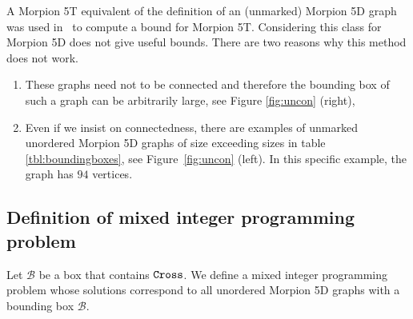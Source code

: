 \begin{remark}
%
A Morpion 5T equivalent of the definition of an (unmarked) Morpion 5D graph was 
  used in~\cite{ijcai} to compute a bound for Morpion 5T.
Considering this class for Morpion 5D  does not give useful bounds. There are two reasons why this method does not work.
\begin{enumerate}
\item These graphs need not to be connected and therefore the bounding box of such a graph
  can be arbitrarily large, see Figure \ref{fig:uncon} (right), 
\item Even if we insist on connectedness, there are examples of unmarked unordered Morpion 5D graphs of size exceeding sizes in 
table \ref{tbl:boundingboxes}, see Figure~\ref{fig:uncon} (left). In this specific example, the graph has $94$ vertices.
\end{enumerate}
\end{remark}

\subsection{Definition of mixed integer programming problem}

Let $\mathcal{B}$ be a box that contains $\texttt{Cross}$. 
We define a mixed integer programming problem whose solutions correspond to all unordered Morpion 5D graphs with a bounding 
   box $\mathcal{B}$.
  
\newcommand{\mv}{\operatorname{mv}}
\renewcommand{\dt}{\operatorname{dt}}

